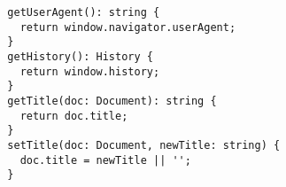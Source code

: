 \begin{verbatim}
  getUserAgent(): string {
    return window.navigator.userAgent;
  }
  getHistory(): History {
    return window.history;
  }
  getTitle(doc: Document): string {
    return doc.title;
  }
  setTitle(doc: Document, newTitle: string) {
    doc.title = newTitle || '';
  }
\end{verbatim}
